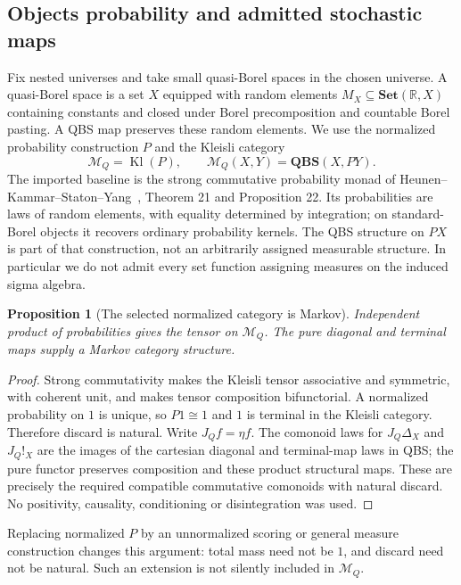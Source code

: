 \documentclass[11pt,a4paper]{article}
\newtheorem{proposition}[theorem]{Proposition}
\theoremstyle{definition}
\newcommand{\Set}{\mathbf{Set}}
\newcommand{\QBS}{\mathbf{QBS}}
\begin{document}
\subsection{Objects probability and admitted stochastic maps}
Fix nested universes and take small quasi-Borel spaces in the chosen universe.
A quasi-Borel space is a set $X$ equipped with random elements
$M_X\subseteq\Set(\mathbb R,X)$ containing constants and closed under Borel
precomposition and countable Borel pasting. A QBS map preserves these random
elements. We use the normalized probability construction $P$ and the
Kleisli category
\[
 \mathcal M_Q=\operatorname{Kl}(P),\qquad
 \mathcal M_Q(X,Y)=\QBS(X,PY).
\]
The imported baseline is the strong commutative probability monad of
Heunen--Kammar--Staton--Yang~\cite{QBS2017}, Theorem 21 and Proposition 22.
Its probabilities are laws of random elements, with equality determined by
integration; on standard-Borel objects it recovers ordinary probability
kernels. The QBS structure on $PX$ is part of that construction, not an
arbitrarily assigned measurable structure. In particular we do not admit
every set function assigning measures on the induced sigma algebra.

\begin{proposition}[The selected normalized category is Markov]
\label{prop:markov}
Independent product of probabilities gives the tensor on $\mathcal M_Q$.
The pure diagonal and terminal maps supply a Markov category structure.
\end{proposition}
\begin{proof}
Strong commutativity makes the Kleisli tensor associative and symmetric,
with coherent unit, and makes tensor composition bifunctorial. A normalized
probability on $1$ is unique, so $P1\cong1$ and $1$ is terminal in the Kleisli
category. Therefore discard is natural. Write $J_Qf=\eta f$. The comonoid
laws for $J_Q\Delta_X$ and $J_Q!_X$ are the images of the cartesian diagonal
and terminal-map laws in QBS; the pure functor preserves composition and
these product structural maps. These are precisely the required compatible
commutative comonoids with natural discard. No positivity, causality,
conditioning or disintegration was used.
\end{proof}
Replacing normalized $P$ by an unnormalized scoring or general measure
construction changes this argument: total mass need not be $1$, and discard
need not be natural. Such an extension is not silently included in
$\mathcal M_Q$.
\end{document}
